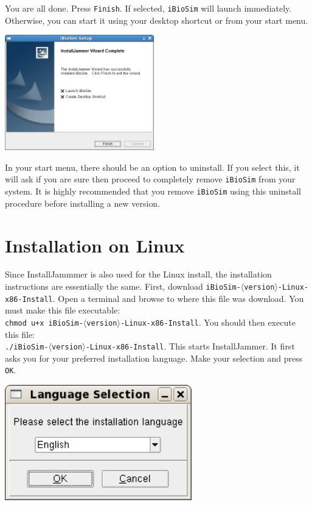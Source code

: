 \documentclass[titlepage,11pt]{article}
\begin{document}
You are all done.  Press {\tt Finish}.  If selected, {\tt iBioSim}
will launch immediately.  Otherwise, you can start it using your
desktop shortcut or from your start menu.

\includegraphics[height=50mm]{screenshots/finish}

In your start menu, there should be an option to uninstall.  If you
select this, it will ask if you are sure then proceed to completely
remove {\tt iBioSim} from your system.  It is highly recommended that
you remove {\tt iBioSim} using this uninstall procedure before
installing a new version.

\section{Installation on Linux}

\noindent
Since InstallJammmer is also used for the Linux install, the
installation instructions are essentially the same.
First, download {\tt iBioSim-$\langle$version$\rangle$-Linux-x86-Install}.
Open a terminal and browse to where this file was download.  You must
make this file executable:\\
{\tt chmod u+x iBioSim-$\langle$version$\rangle$-Linux-x86-Install}.
You should then execute this file:\\
{\tt ./iBioSim-$\langle$version$\rangle$-Linux-x86-Install}.
This starts InstallJammer.  It first asks you for your
preferred installation language.  Make your selection and press {\tt OK}.

\includegraphics[height=50mm]{screenshots/language}
\end{document}
